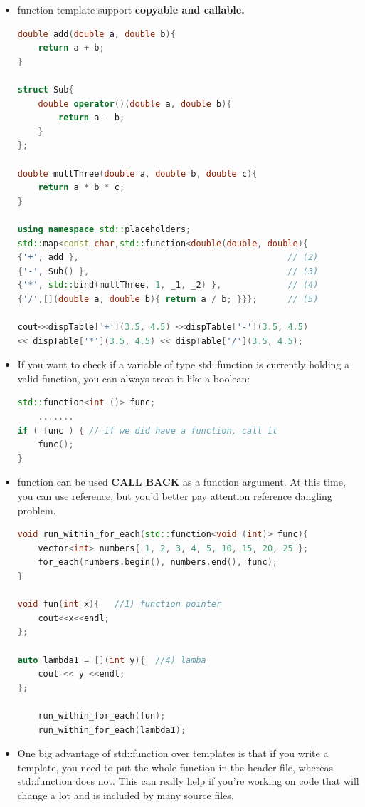 \documentclass[a4paper,11pt,twoside]{book}
\begin{document}
\begin{itemize}
	\item function template support \textbf{copyable and callable.}
\begin{lstlisting}[frame=single, language=c++]
double add(double a, double b){
	return a + b;
}
	
struct Sub{
	double operator()(double a, double b){
		return a - b;
	}
};
	
double multThree(double a, double b, double c){
	return a * b * c;
}
	
using namespace std::placeholders;
std::map<const char,std::function<double(double, double){
{'+', add },                                         // (2)
{'-', Sub() },                                       // (3)
{'*', std::bind(multThree, 1, _1, _2) },             // (4)
{'/',[](double a, double b){ return a / b; }}};      // (5)

cout<<dispTable['+'](3.5, 4.5) <<dispTable['-'](3.5, 4.5) 
<< dispTable['*'](3.5, 4.5) << dispTable['/'](3.5, 4.5);
\end{lstlisting}
	
	\item If you want to check if a variable of type std::function is currently holding a valid function, you can always treat it like a boolean:
\begin{lstlisting}[frame=single, language=c++]
std::function<int ()> func;
	.......
if ( func ) { // if we did have a function, call it
	func();
}
\end{lstlisting}
	
	\item function can be used \textbf{CALL BACK} as a function argument. At this time, you can use reference, but you'd better pay attention reference dangling problem. 
	
\begin{lstlisting}[frame=single, language=c++]
void run_within_for_each(std::function<void (int)> func){
	vector<int> numbers{ 1, 2, 3, 4, 5, 10, 15, 20, 25 };
	for_each(numbers.begin(), numbers.end(), func);
}
	
void fun(int x){   //1) function pointer
	cout<<x<<endl;
};
	
auto lambda1 = [](int y){  //4) lamba
	cout << y <<endl;
};
	
	run_within_for_each(fun);
	run_within_for_each(lambda1);
\end{lstlisting}
	
	\item One big advantage of std::function over templates is that if you write a template, you need to put the whole function in the header file, whereas std::function does not. This can really help if you're working on code that will change a lot and is included by many source files.
	

\end{itemize}
\end{document}
